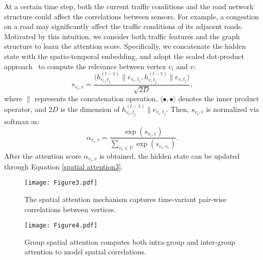 \documentclass[letterpaper]{article} \usepackage{aaai20}  \usepackage{times}  \usepackage{helvet} \usepackage{courier}  \usepackage[hyphens]{url}  \usepackage{graphicx} \usepackage{amsmath}
\begin{document}
At a certain time step, both the current traffic conditions and the road network structure could affect the correlations between sensors. For example, a congestion on a road may significantly affect the traffic conditions of its adjacent roads. Motivated by this intuition, we consider both traffic features and the graph structure to learn the attention score. Specifically, we concatenate the hidden state with the spatio-temporal embedding, and adopt the scaled dot-product approach~\cite{Vaswani-et-al:NIPS2017} to compute the relevance between vertex $ v_i $ and $ v $:
\begin{equation}
s_{v_i,v} = \dfrac{ \langle h_{v_i,t_j}^{(l-1)} \parallel e_{v_i,t_j}, h_{v,t_j}^{(l-1)} \parallel e_{v,t_j} \rangle } {\sqrt{2D}}, 
\end{equation}
where $ \parallel $ represents the concatenation operation, $ \langle \bullet , \bullet \rangle $ denotes the inner product operator, and $ 2D $ is the dimension of $ h_{v_i,t_j}^{(l-1)} \parallel e_{v_i,t_j} $. Then, $ s_{v_i,v} $ is normalized via softmax as:
\begin{equation}
\alpha_{v_i,v} = \dfrac{ \exp ( s_{v_i,v} ) }{ \sum\nolimits_{v_r \in \mathcal{V}} \exp ( s_{v_i,v_r} ) }.
\end{equation}
After the attention score $ \alpha_{v_i,v} $ is obtained, the hidden state can be updated through Equation \ref{spatial attention3}.

\begin{figure}
	\centering
	\texttt{[image: Figure3.pdf]} \\
	\caption{The spatial attention mechanism captures time-variant pair-wise correlations between vertices.}
	\label{Figure3}
\end{figure}

\begin{figure}
	\centering
	\texttt{[image: Figure4.pdf]} \\
	\caption{Group spatial attention computes both intra-group and inter-group attention to model spatial correlations.}
	\label{Figure4}
\end{figure}
\end{document}
